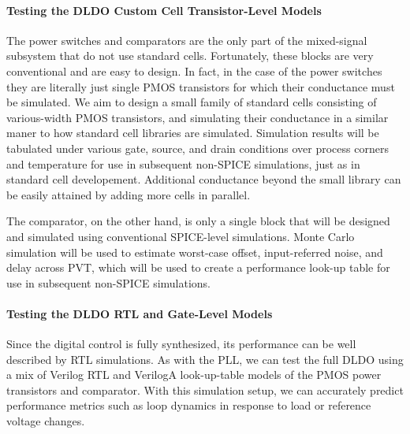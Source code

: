 \paragraph{Testing the DLDO Custom Cell Transistor-Level Models}
The power switches and comparators are the only part of the mixed-signal
subsystem that do not use standard cells. Fortunately, these blocks are very conventional and are easy to design. In fact, in the case of the power switches they are literally just single PMOS transistors for which their conductance must be simulated. We aim to design a small family of standard cells consisting of various-width PMOS transistors, and simulating their conductance in a similar maner to how standard cell libraries are simulated. Simulation results will be tabulated under various gate, source, and drain conditions over process corners and temperature for use in subsequent non-SPICE simulations, just as in standard cell developement. Additional conductance beyond the small library can be easily attained by adding more cells in parallel. 

The comparator, on the other hand, is only a single block that will be designed and simulated using conventional SPICE-level simulations. Monte Carlo simulation will be used to estimate worst-case offset, input-referred noise, and delay across PVT, which will be used to create a performance look-up table for use in subsequent non-SPICE simulations. 


\paragraph{Testing the DLDO RTL and Gate-Level Models}
Since the digital control is fully synthesized, its performance can be
well described by RTL simulations. As with the PLL, we can test the full
DLDO using a mix of Verilog RTL and VerilogA look-up-table models of the PMOS power transistors and comparator.  With this simulation setup, we can
accurately predict performance metrics such as loop dynamics in response to load
or reference voltage changes. 


